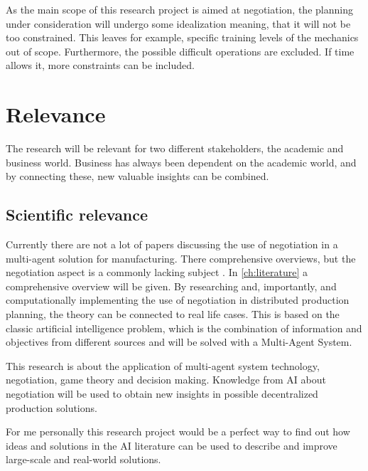 As the main scope of this research project is aimed at negotiation, the planning under consideration will undergo some idealization meaning, that it will not be too constrained. This leaves for example, specific training levels of the mechanics out of scope. Furthermore, the possible difficult operations are excluded.  If time allows it, more constraints can be included.

%

\section{Relevance}%
The research will be relevant for two different stakeholders, the academic and business world. Business has always been dependent on the academic world, and by connecting these, new valuable insights can be combined.
\subsection{Scientific relevance}
Currently there are not a lot of papers discussing the use of negotiation in a multi-agent solution for manufacturing. There comprehensive overviews, but the negotiation aspect is a commonly lacking subject \citep{leitao2009agent}. In \cref{ch:literature} a comprehensive overview will be given. By researching and, importantly, and computationally implementing the use of negotiation in distributed production planning, the theory can be connected to real life cases. This is based on the classic artificial intelligence problem, which is the combination of information and objectives from different sources and will be solved with a Multi-Agent System.  %

This research is about the application of multi-agent system technology, negotiation, game theory and decision making. Knowledge from AI about negotiation will be used to obtain new insights in possible decentralized production solutions.  

For me personally this research project would be a perfect way to find out how ideas and solutions in the AI literature can be used to describe and improve large-scale and real-world solutions.
